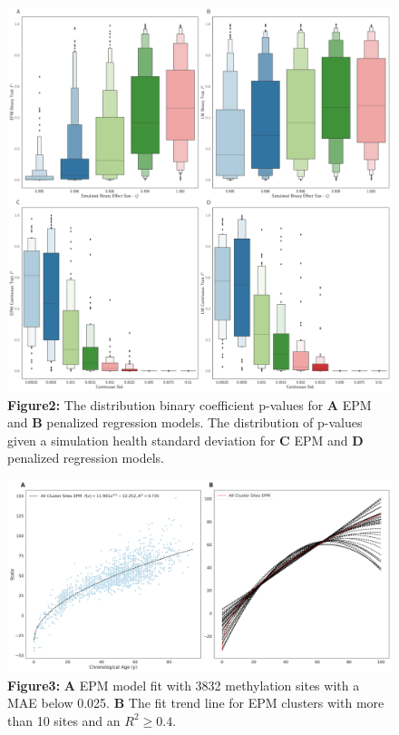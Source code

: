 \documentclass{article}
\begin{document}
{{\begin{center}
    \begin{figure}
    \includegraphics[scale=.25]{Figures/Figure2.png}
    \footnotesize
    \caption*{\small \textbf{Figure2:} The distribution binary coefficient p-values for \textbf{A} EPM and \textbf{B} 
    penalized regression models. The distribution of p-values given a simulation health standard 
    deviation for \textbf{C} EPM and \textbf{D} penalized regression models.}
    \end{figure}
\end{center}


\begin{center}
    \begin{figure}
    \includegraphics[scale=.25]{Figures/Figure3.png}
    \footnotesize
    \caption*{\small \textbf{Figure3:} \textbf{A} EPM model fit with 3832 methylation sites with a MAE below 0.025. 
                    \textbf{B} The fit trend line for EPM clusters with more than 10 sites and an $R^2 \geq 0.4$.}
    \end{figure}
\end{center}

}}
\end{document}
